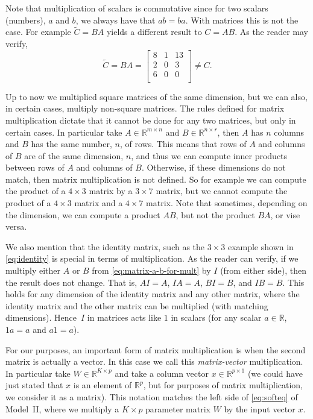 \documentclass[12pt]{article}
\begin{document}
Note that multiplication of scalars is commutative since for two scalars (numbers), $a$ and $b$, we always have that $ab = ba$. With matrices this is not the case. For example $\tilde{C}=BA$ yields a different result to $C= AB$. As the reader may verify,
%
\begin{equation}
\label{eq:matrix-example-2}
\tilde{C} = BA = 
\begin{bmatrix}
8 & 1 & 13 \\
2 & 0 & 3 \\
6 & 0 & 0 \\
\end{bmatrix}
\neq C.
\end{equation}
%

Up to now we multiplied square matrices of the same dimension, but we can also, in certain cases, multiply non-square matrices. The rules defined for matrix multiplication dictate that it cannot be done for any two matrices, but only in certain cases. In particular take $A \in {\mathbb R}^{m \times n}$ and $B \in {\mathbb R}^{n \times r}$, then $A$ has $n$ columns and $B$ has the same number, $n$, of rows. This means that rows of $A$ and columns of $B$ are of the same dimension, $n$, and thus we can compute inner products between rows of $A$ and columns of $B$. Otherwise, if these dimensions do not match, then matrix multiplication is not defined. So for example we can compute the product of a $4 \times 3$ matrix by a $3 \times 7$ matrix, but we cannot compute the product of a $4 \times 3$ matrix and a $4 \times 7$ matrix. Note that sometimes, depending on the dimension, we can compute a product $AB$, but not the product $BA$, or vise versa.

We also mention that the identity matrix, such as the $3 \times 3$ example shown in \eqref{eq:identity} is special in terms of multiplication. As the reader can verify, if we multiply either $A$ or $B$ from \eqref{eq:matrix-a-b-for-mult} by $I$ (from either side), then the result does not change. That is, $AI = A$, $IA = A$, $BI = B$, and $IB = B$. This holds for any dimension of the identity matrix and any other matrix, where the identity matrix and the other matrix can be multiplied (with matching dimensions). Hence~$I$ in matrices acts like $1$ in scalars (for any scalar $a \in {\mathbb R}$, $1a = a$ and $a1 = a$).

For our purposes, an important form of matrix multiplication is when the second matrix is actually a vector. In this case we call this {\em matrix-vector} multiplication. In particular take $W \in {\mathbb R}^{K \times p}$ and take a column vector $x \in {\mathbb R}^{p \times 1}$ (we could have just stated that $x$ is an element of ${\mathbb R}^p$, but for purposes of matrix multiplication, we consider it as a matrix). This notation matches the left side of \eqref{eq:softeq} of Model~II, where we multiply a $K \times p$ parameter matrix $W$ by the input vector $x$. 
\end{document}
